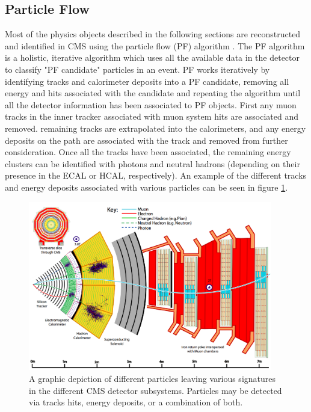 \subsection{Particle Flow}
\label{subsec:pf}
Most of the physics objects described in the following sections are reconstructed and identified in CMS using the particle flow (PF) algorithm \cite{Sirunyan:2017ulk}. The PF algorithm is a holistic, iterative algorithm which uses all the available data in the detector to classify "PF candidate" particles in an event. PF works iteratively by identifying tracks and calorimeter deposits into a PF candidate, removing all energy and hits associated with the candidate and repeating the algorithm until all the detector information has been associated to PF objects. First any muon tracks in the inner tracker associated with muon system hits are associated and removed. remaining tracks are extrapolated into the calorimeters, and any energy deposits on the path are associated with the track and removed from further consideration. Once all the tracks have been associated, the remaining energy clusters can be identified with photons and neutral hadrons (depending on their presence in the ECAL or HCAL, respectively). An example of the different tracks and energy deposits associated with various particles can be seen in figure \ref{fig:pfCandidates}.
\begin{figure}
	\centering
	\includegraphics[width=0.95\textwidth]{detector/figs/CMS_Slice_2}
	\renewcommand{\baselinestretch}{1.0}
	\caption[A graphic depiction of different particles leaving various signatures in the different CMS detector subsystems.]{A graphic depiction of different particles leaving various signatures in the different CMS detector subsystems. Particles may be detected via tracks hits, energy deposits, or a combination of both.}
	\label{fig:pfCandidates}
\end{figure}

